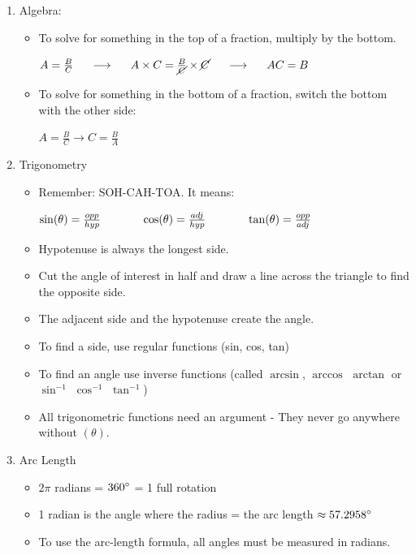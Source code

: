 \documentclass[letterpaper, 12pt]{article}
\begin{document}
\begin{enumerate}
	\vspace{0.25in}
	\item Algebra:
	\begin{itemize}
		\item To solve for something in the top of a fraction, multiply by the bottom.
		\begin{center}
			$A = \frac {B}{C} \hspace{0.2in} \longrightarrow \hspace{0.2in} A \times C = \frac {B}{\cancel{C}} \times \cancel{C} \hspace{0.2in} \longrightarrow  \hspace{0.2in} A C = B	$
		\end{center}
		\item To solve for something in the bottom of a fraction, switch the bottom with the other side:
		\begin{center}
			$A = \frac {B}{C} \rightarrow C = \frac {B}{A}	$
		\end{center}
		\end{itemize}
	\vspace{2in} 
	\item Trigonometry
	\begin{itemize}
		\item Remember: SOH-CAH-TOA.  It means:
		\begin{center}
			$\sin(\theta) = \frac{opp}{hyp} \hspace{0.5in} \cos(\theta) = \frac{adj}{hyp} \hspace{0.5in} \tan(\theta) = \frac{opp}{adj}	$	
		\end{center}
	\item Hypotenuse is always the longest side.
	\item Cut the angle of interest in half and draw a line across the triangle to find the opposite side.
	\item The adjacent side and the hypotenuse create the angle.
	\item To find a side, use regular functions (sin, cos, tan)
	\item To find an angle use inverse functions (called $\arcsin$, $\arccos$ $\arctan$ or $\sin^{-1}$ $\cos^{-1}$ $\tan^{-1}$)
	\item All trigonometric functions need an argument - They never go anywhere without $(\theta)$.	
	\end{itemize}
	
	\item Arc Length
	\begin{itemize}
		\item $2\pi $ radians = $360 \degree $  = 1 full rotation
		\item 1 radian is the angle where the radius = the arc length $\approx 57.2958\degree$
		\item To use the arc-length formula, all angles must be measured in radians.
	\end{itemize}
\end{enumerate}
 
\end{document}
